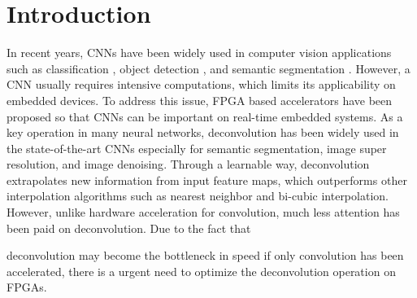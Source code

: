 \documentclass[conference]{IEEEtran}
\begin{document}
%
\IEEEpeerreviewmaketitle



\section{Introduction}
In recent years, CNNs have been widely used in computer vision applications such as classification \cite{ref:vgg_2014}, object detection \cite{ref:fasterrcnn_2015}%
, and semantic segmentation \cite{ref:fcn_2015}. However, a CNN usually requires intensive computations, which limits its applicability on embedded devices. To address this issue, FPGA based accelerators \cite{ref:eyeriss_2016} %
have been proposed so that CNNs can be important on real-time embedded systems. As a key operation in many neural networks, deconvolution has been widely used in the state-of-the-art CNNs especially for semantic segmentation\cite{ref:fcn_2015}, image super resolution\cite{ref:super_res_2017}, and image denoising\cite{ref:denoise_2017}. Through a learnable way, deconvolution extrapolates new information from input feature maps, which outperforms other interpolation algorithms such as nearest neighbor and bi-cubic interpolation. However, unlike hardware acceleration for convolution, much less attention has been paid on deconvolution. Due to the fact that 
\begin{comment}
1) there are lots of CNNs, especially for segmentation tasks like FCN\cite{ref:fcn_2015}, U-net\cite{ref:u-net_2015} and SegNet\cite{ref:segnet_2017}, contain deconvolution, and 2) 
\end{comment}
deconvolution may become the bottleneck in speed if only convolution has been accelerated, there is a urgent need to optimize the deconvolution operation on FPGAs.
\begin{comment}
According to the network structure of CNNs mentioned above, the feature extraction part includes convolution only while during upsampling, both convolution and deconvolution are involved in a hybrid way. It's not possible to perform both operation in parallel. So that separating the convolution and deconvolution as two peripherals is not efficient. Therefore, merging them into one computation unit is more practical for real world applications.
\end{comment}
\end{document}

